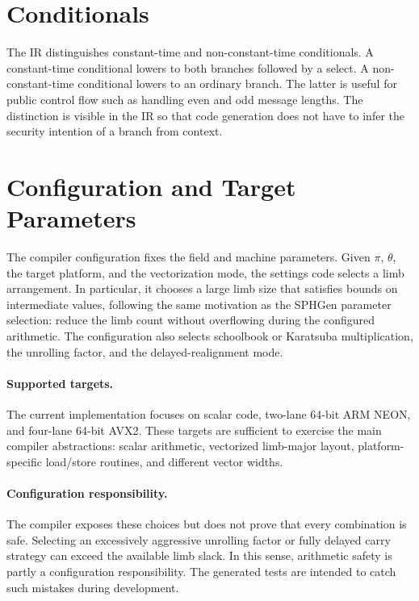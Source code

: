 \section{Conditionals}
\label{sec:compiler-conditionals}

The IR distinguishes constant-time and non-constant-time conditionals. A constant-time conditional lowers to both branches followed by a select. A non-constant-time conditional lowers to an ordinary branch. The latter is useful for public control flow such as handling even and odd message lengths. The distinction is visible in the IR so that code generation does not have to infer the security intention of a branch from context.

\section{Configuration and Target Parameters}
\label{sec:configuration-targets}

The compiler configuration fixes the field and machine parameters. Given \(\pi\), \(\theta\), the target platform, and the vectorization mode, the settings code selects a limb arrangement. In particular, it chooses a large limb size that satisfies bounds on intermediate values, following the same motivation as the SPHGen parameter selection: reduce the limb count without overflowing during the configured arithmetic. The configuration also selects schoolbook or Karatsuba multiplication, the unrolling factor, and the delayed-realignment mode.

\paragraph{Supported targets.}
The current implementation focuses on scalar code, two-lane 64-bit ARM NEON, and four-lane 64-bit AVX2. These targets are sufficient to exercise the main compiler abstractions: scalar arithmetic, vectorized limb-major layout, platform-specific load/store routines, and different vector widths.

\paragraph{Configuration responsibility.}
The compiler exposes these choices but does not prove that every combination is safe. Selecting an excessively aggressive unrolling factor or fully delayed carry strategy can exceed the available limb slack. In this sense, arithmetic safety is partly a configuration responsibility. The generated tests are intended to catch such mistakes during development.
